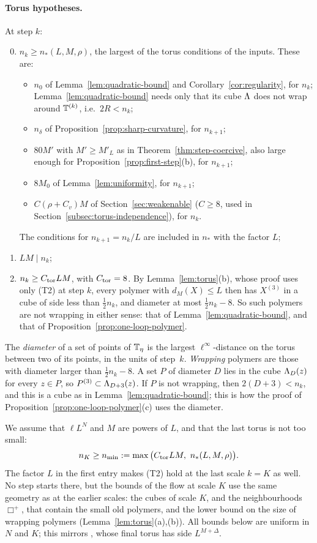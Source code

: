\paragraph{Torus hypotheses.} At step $k$:
\begin{enumerate}[label=(T\arabic*)]
\setcounter{enumi}{-1}
\item $n_k\ge n_*(L,M,\rho)$, the largest of the torus conditions of the inputs. These are:
  \begin{itemize}
  \item $n_0$ of Lemma~\ref{lem:quadratic-bound} and Corollary~\ref{cor:regularity}, for $n_k$; Lemma~\ref{lem:quadratic-bound} needs only that its cube $\Lambda$ does not wrap around $\mathbb T^{(k)}$, i.e.\ $2R<n_k$;
  \item $n_\delta$ of Proposition~\ref{prop:sharp-curvature}, for $n_{k+1}$;
  \item $80M'$ with $M'\ge M'_L$ as in Theorem~\ref{thm:step-coercive}, also large enough for Proposition~\ref{prop:first-step}(b), for $n_{k+1}$;
  \item $8M_0$ of Lemma~\ref{lem:uniformity}, for $n_{k+1}$;
  \item $C(\rho+C_v)M$ of Section~\ref{sec:weakenable} ($C\ge8$, used in Section~\ref{subsec:torus-independence}), for $n_k$.
  \end{itemize}
  The conditions for $n_{k+1}=n_k/L$ are included in $n_*$ with the factor $L$;
\item $LM\mid n_k$;
\item $n_k\ge C_{\rm tor}LM$, with $C_{\rm tor}=8$. By Lemma~\ref{lem:torus}(b), whose proof uses only (T2) at step $k$, every polymer with $d_M(X)\le L$ then has $X^{(3)}$ in a cube of side less than $\frac12n_k$, and diameter at most $\frac12n_k-8$. So such polymers are not wrapping in either sense: that of Lemma~\ref{lem:quadratic-bound}, and that of Proposition~\ref{prop:one-loop-polymer}.
\end{enumerate}
The \emph{diameter} of a set of points of $\mathbb T_\eta$ is the largest $\ell^\infty$-distance on the torus between two of its points, in the units of step~$k$. \emph{Wrapping} polymers are those with diameter larger than $\frac12n_k-8$. A set $P$ of diameter $D$ lies in the cube $\Lambda_D(z)$ for every $z\in P$, so $P^{(3)}\subset\Lambda_{D+3}(z)$. If $P$ is not wrapping, then $2(D+3)<n_k$, and this is a cube as in Lemma~\ref{lem:quadratic-bound}; this is how the proof of Proposition~\ref{prop:one-loop-polymer}(c) uses the diameter.

We assume that $\ell L^N$ and $M$ are powers of $L$, and that the last torus is not too small:
\[
n_K\ge n_{\min}:=\max\big(C_{\rm tor}LM,\ n_*(L,M,\rho)\big).
\]
The factor $L$ in the first entry makes (T2) hold at the last scale $k=K$ as well. No step starts there, but the bounds of the flow at scale $K$ use the same geometry as at the earlier scales: the cubes of scale $K$, and the neighbourhoods $\Box^+$, that contain the small old polymers, and the lower bound on the size of wrapping polymers (Lemma~\ref{lem:torus}(a),(b)). All bounds below are uniform in $N$ and $K$; this mirrors \cite{DimockI}, whose final torus has side $L^{M+\Delta}$.

